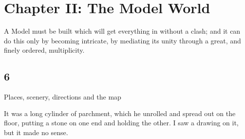 {{\chapter{Chapter II: The Model World}

\vskip 0.5in
\quote
A Model must be built which will get everything in without
a clash; and it can do this only by becoming intricate,
by mediating its unity through a great, and finely ordered,
multiplicity.

\section{6}{Places, scenery, directions and the map}

\quote
It was a long cylinder of parchment, which he unrolled and spread out
on the floor, putting a stone on one end and holding the other.
I saw a drawing on it, but it made no sense.

}}
